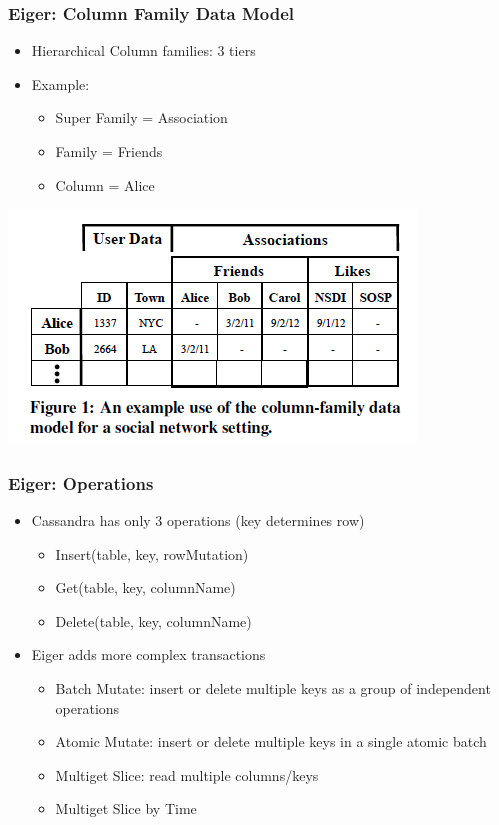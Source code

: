 \documentclass{beamer}
\begin{document}
\begin{frame}
\frametitle{Eiger: Column Family Data Model}
\begin{itemize}
\item Hierarchical Column families: 3 tiers

\item Example:
	\begin{itemize}
		\item Super Family = Association
		\item Family = Friends
		\item Column = Alice
	\end{itemize}
\end{itemize}  
\includegraphics[scale=0.5]{Figure_Lloyd_ColumnHierarchy.png}
\end{frame}


\begin{frame}
\frametitle{Eiger: Operations}
\begin{itemize}
\item Cassandra has only 3 operations (key determines row)
	\begin{itemize}
		\item Insert(table, key, rowMutation)
		\item Get(table, key, columnName)
		\item Delete(table, key, columnName)
	\end{itemize}
\pause \item Eiger adds more complex transactions
	\begin{itemize}
		\item Batch Mutate: insert or delete multiple keys as a group of independent operations
		\item Atomic Mutate: insert or delete multiple keys in a single atomic batch
		\item Multiget Slice: read multiple columns/keys
		\item Multiget Slice by Time
	\end{itemize}	
\end{itemize}  
\end{frame}
\end{document}
